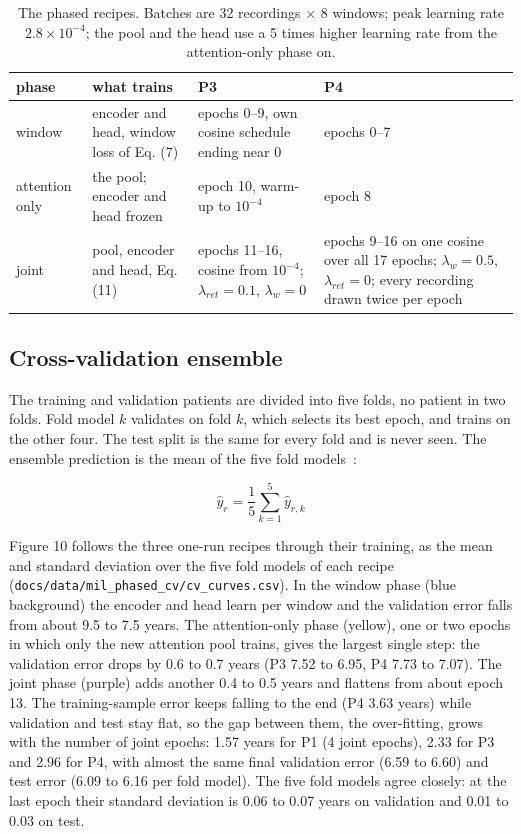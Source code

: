 \documentclass[11pt,a4paper]{article}
\begin{document}
\begin{table}[t]
\centering
\small
\caption{The phased recipes. Batches are 32 recordings $\times$ 8 windows; peak learning rate $2.8 \times 10^{-4}$; the pool and the head use a 5 times higher learning rate from the attention-only phase on.}
\begin{tabular}{llll}
\toprule
\textbf{phase} & \textbf{what trains} & \textbf{P3} & \textbf{P4} \\
\midrule
window & encoder and head, window loss of Eq. (7) & epochs 0--9, own cosine schedule ending near 0 & epochs 0--7 \\
attention only & the pool; encoder and head frozen & epoch 10, warm-up to $10^{-4}$ & epoch 8 \\
joint & pool, encoder and head, Eq. (11) & epochs 11--16, cosine from $10^{-4}$; $\lambda_{ret} = 0.1$, $\lambda_w = 0$ & epochs 9--16 on one cosine over all 17 epochs; $\lambda_w = 0.5$, $\lambda_{ret} = 0$; every recording drawn twice per epoch \\
\bottomrule
\end{tabular}
\end{table}


\subsection{Cross-validation ensemble}

The training and validation patients are divided into five folds, no patient in two folds. Fold model $k$ validates on fold $k$, which selects its best epoch, and trains on the other four. The test split is the same for every fold and is never seen. The ensemble prediction is the mean of the five fold models~\citep{lakshminarayanan2017ensembles}:

\begin{equation}
\hat y_r = \frac{1}{5} \sum_{k=1}^{5} \hat y_{r,k} \tag{12}
\end{equation}

Figure 10 follows the three one-run recipes through their training, as the mean and standard deviation over the five fold models of each recipe (\texttt{docs/data/mil\_phased\_cv/cv\_curves.csv}). In the window phase (blue background) the encoder and head learn per window and the validation error falls from about 9.5 to 7.5 years. The attention-only phase (yellow), one or two epochs in which only the new attention pool trains, gives the largest single step: the validation error drops by 0.6 to 0.7 years (P3 7.52 to 6.95, P4 7.73 to 7.07). The joint phase (purple) adds another 0.4 to 0.5 years and flattens from about epoch 13. The training-sample error keeps falling to the end (P4 3.63 years) while validation and test stay flat, so the gap between them, the over-fitting, grows with the number of joint epochs: 1.57 years for P1 (4 joint epochs), 2.33 for P3 and 2.96 for P4, with almost the same final validation error (6.59 to 6.60) and test error (6.09 to 6.16 per fold model). The five fold models agree closely: at the last epoch their standard deviation is 0.06 to 0.07 years on validation and 0.01 to 0.03 on test.
\end{document}
